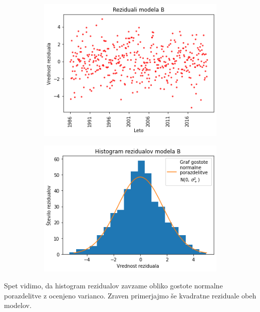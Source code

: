 \documentclass[12pt, a4paper]{article}
\begin{document}
\begin{figure}[!h]
    \begin{subfigure}{0.45\textwidth}
		\centering
		\includegraphics[width=\textwidth]{Naloga_3_09}
	\end{subfigure}
    \begin{subfigure}{0.45\textwidth}
		\centering
		\includegraphics[width=\textwidth]{Naloga_3_10}
	\end{subfigure}
\end{figure}

Spet vidimo, da histogram rezidualov zavzame obliko gostote normalne porazdelitve 
z ocenjeno varianco. Zraven primerjajmo še kvadratne reziduale obeh modelov. 
\end{document}
